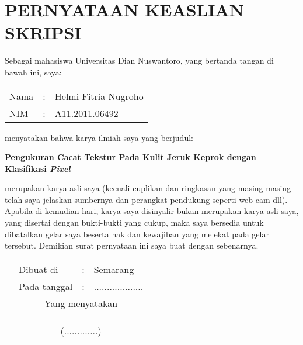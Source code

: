 \documentclass[laporan.tex]{subfiles}
\begin{document}
\chapter*{PERNYATAAN KEASLIAN SKRIPSI}

Sebagai mahasiswa Universitas Dian Nuswantoro, yang bertanda tangan di bawah ini, saya:

\begin{tabular}{l c l}
Nama & : & Helmi Fitria Nugroho \\
NIM & : & A11.2011.06492 \\
\end{tabular}

menyatakan bahwa karya ilmiah saya yang berjudul:

\begin{centering}
\bfseries Pengukuran Cacat Tekstur Pada Kulit Jeruk Keprok dengan Klasifikasi \emph{Pixel}
\end{centering}

merupakan karya asli saya (kecuali cuplikan dan ringkasan yang masing-masing telah saya jelaskan sumbernya dan perangkat pendukung seperti web cam dll). Apabila di kemudian hari, karya saya disinyalir bukan merupakan karya asli saya, yang disertai dengan bukti-bukti yang cukup, maka saya bersedia untuk dibatalkan gelar saya beserta hak dan kewajiban yang melekat pada gelar tersebut. Demikian surat pernyataan ini saya buat dengan sebenarnya.

\begin{tabular}{p{10em} l c l}
& Dibuat di & : & Semarang \\
& Pada tanggal & : & ................... \\
& \multicolumn{3}{c}{Yang menyatakan} \\
& & & \\
& & & \\
& & & \\
& \multicolumn{3}{c}{(.............)} \\
\end{tabular}
\end{document}

